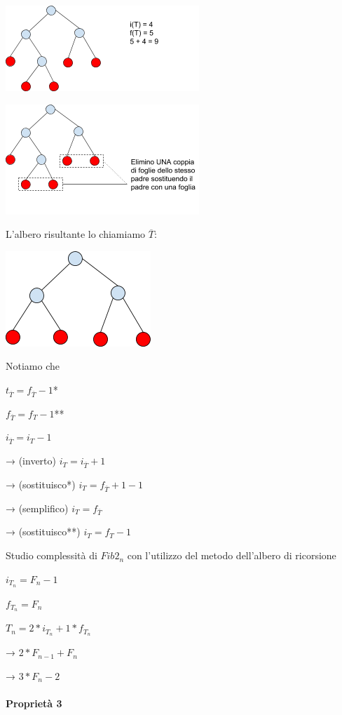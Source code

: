 \documentclass[tikz]{article}
\let\oldparagraph\paragraph
\renewcommand{\paragraph}[1]{\oldparagraph{#1}\mbox{}}
\begin{document}
{{{{\includegraphics{images/image525.png}}

{\includegraphics{images/image536.png}}

{L'albero risultante lo chiamiamo $\overline{T}$:}

{\includegraphics{images/image522.png}}

{Notiamo che }

$t_{\overline{T}} = f_{\overline{T}}-1${*}

$f_{\overline{T}} = f_{T}-1${**}

$i_{\overline{T}} = i_{T}-1$

{→ (inverto) $i_T=i_{\overline{T}}+1$}

{→ (sostituisco*) $i_T=f_{\overline{T}}+1-1$}

{→ (semplifico) $i_T=f_{\overline{T}}$}

{→ (sostituisco**) $i_T=f_T-1$}

{Studio complessità di $Fib2_n$ con l'utilizzo del metodo dell'albero di ricorsione}

$i_{T_n}=F_n-1$

$f_{T_n}=F_n$

$T_n = 2 * i_{T_n}+1*f_{T_n}$

{→ $2 * F_{n-1} + F_n$}

{→ $3 * F_n - 2$}

\paragraph{Proprietà 3}

}}}
\end{document}
